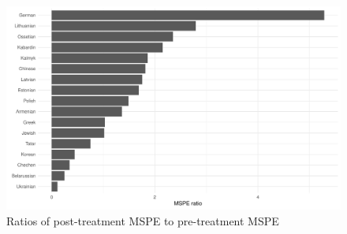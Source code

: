 \begin{figure}[h]
\centering
\includegraphics[width=\textwidth]{plots/synthetic_control/mspe_ratios.pdf}
\caption{Ratios of post-treatment MSPE to pre-treatment MSPE}
\label{fig:sc_mspe_ratios}
\end{figure}
